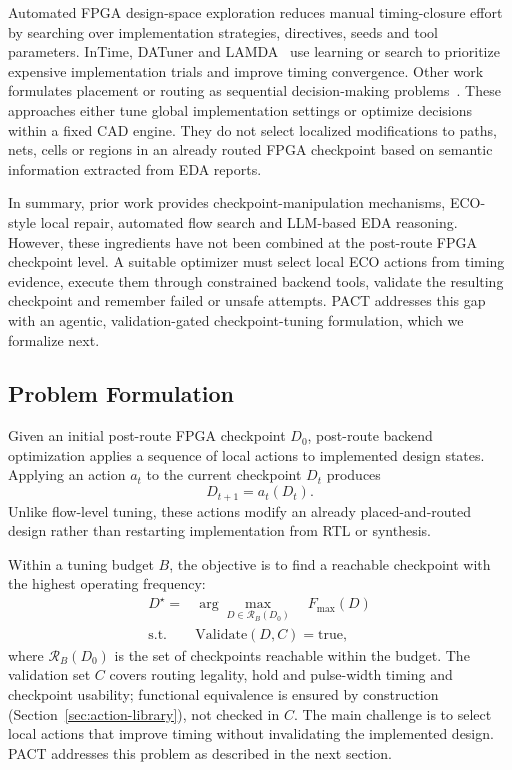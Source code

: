 \documentclass[conference]{IEEEtran}
\begin{document}
Automated FPGA design-space exploration reduces manual timing-closure
effort by searching over implementation strategies, directives, seeds
and tool parameters. InTime, DATuner and
LAMDA~\cite{kapre_intime_2015,xu_datuner_2017,ustun_lamda_2019} use
learning or search to prioritize expensive implementation trials and
improve timing convergence. Other work formulates placement or routing
as sequential
decision-making problems~\cite{elgammal_rlplace_2022,
esmaeili_guiding_fpga_detailed_placement_2022,
farooq_efficient_fpga_routing_2021}. These approaches either tune
global implementation settings or optimize decisions within a fixed CAD
engine. They do not select localized modifications to paths,
nets, cells or regions in an already routed FPGA checkpoint 
based on semantic information extracted from EDA reports.

In summary, prior work provides checkpoint-manipulation mechanisms,
ECO-style local repair, automated flow search and LLM-based EDA
reasoning. However, these ingredients have not been
combined at the post-route FPGA checkpoint level. A
suitable optimizer must select local ECO actions from timing evidence,
execute them through constrained backend tools, validate the resulting
checkpoint and remember failed or unsafe attempts. PACT
addresses this gap with an agentic, validation-gated checkpoint-tuning
formulation, which we formalize next.


\subsection{Problem Formulation}
\label{sec:problem-formulation}

Given an initial post-route FPGA checkpoint $D_0$, post-route backend
optimization applies a sequence of local actions to implemented design
states. Applying an action $a_t$ to the current checkpoint $D_t$
produces
\begin{equation}
    D_{t+1} = a_t(D_t).
\label{eq:pact-transition}
\end{equation}
Unlike flow-level tuning, these actions modify an already
placed-and-routed design rather than restarting implementation from
RTL or synthesis.

Within a tuning budget $B$, the objective is to find a reachable
checkpoint with the highest operating frequency:
\begin{equation}
\begin{aligned}
D^\star =& \arg\max_{D \in \mathcal{R}_B(D_0)}
    \quad  F_{\max}(D) \\
\mathrm{s.t.}\quad
    & \mathrm{Validate}(D,C)=\mathrm{true},
\end{aligned}
\label{eq:pact-objective}
\end{equation}
where $\mathcal{R}_B(D_0)$ is the set of checkpoints reachable within
the budget. The validation set $C$ covers routing legality, hold and
pulse-width timing and checkpoint usability; functional equivalence is
ensured by construction (Section~\ref{sec:action-library}), not checked
in $C$. The main challenge is to select local actions that improve
timing without invalidating the implemented design. PACT addresses
this problem as described in the next section.
\end{document}
